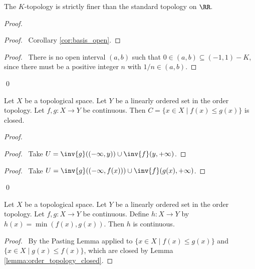 \begin{lemma}
    The $K$-topology is strictly finer than the standard topology on $\RR$.
\end{lemma}

\begin{proof}
    \pf
    \begin{proof}
        \pf\ Corollary \ref{cor:basis_open}.
    \end{proof}
    \begin{proof}
        \pf\ There is no open interval $(a,b)$ such that $0 \in (a,b) \subseteq (-1,1) - K$, since
        there must be a positive integer $n$ with $1/n \in (a,b)$.
    \end{proof}
    \qed
\end{proof}

\begin{lemma}
    \label{lemma:order_topology_closed}
    Let $X$ be a topological space.
    Let $Y$ be a linearly ordered set in the order topology. Let $f, g : X \rightarrow Y$ be continuous. Then $C = \{ x \in X \mid f(x) \leq g(x) \}$ is closed.
\end{lemma}

\begin{proof}
    \pf
    \begin{proof}
        \pf\ Take $U = \inv{g}((-\infty, y)) \cup \inv{f}(y,+\infty)$.
    \end{proof}
    \begin{proof}
        \pf\ Take $U = \inv{g}((-\infty, f(x))) \cup \inv{f}(g(x),+\infty)$.
    \end{proof}
    \qed
\end{proof}

\begin{proposition}
    Let $X$ be a topological space.
    Let $Y$ be a linearly ordered set in the order topology. Let $f, g : X \rightarrow Y$ be continuous. Define $h : X \rightarrow Y$ by $h(x) = \min(f(x),g(x))$.
    Then $h$ is continuous.
\end{proposition}

\begin{proof}
    \pf\ By the Pasting Lemma applied to $\{ x \in X \mid f(x) \leq g(x) \}$ and $\{ x \in X \mid g(x) \leq f(x) \}$, which are closed by Lemma \ref{lemma:order_topology_closed}.
\end{proof}

